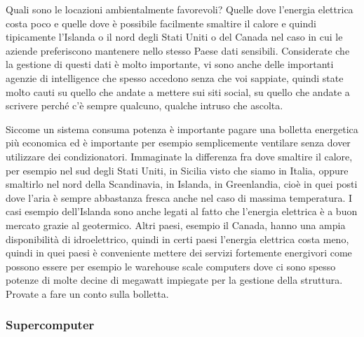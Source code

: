 Quali sono le locazioni ambientalmente favorevoli?
Quelle dove l'energia elettrica costa poco e quelle dove è possibile facilmente smaltire il calore e quindi tipicamente l'Islanda o il nord degli Stati Uniti o del Canada nel caso in cui le aziende preferiscono mantenere nello stesso Paese dati sensibili.
Considerate che la gestione di questi dati è molto importante, vi sono anche delle importanti agenzie di intelligence che spesso accedono senza che voi sappiate, quindi state molto cauti su quello che andate a mettere sui siti social, su quello che andate a scrivere perché c'è sempre qualcuno, qualche intruso che ascolta.

Siccome un sistema consuma potenza è importante pagare una bolletta energetica più economica ed è importante per esempio semplicemente ventilare senza dover utilizzare dei condizionatori.
Immaginate la differenza fra dove smaltire il calore, per esempio nel sud degli Stati Uniti, in Sicilia visto che siamo in Italia, oppure smaltirlo nel nord della Scandinavia, in Islanda, in Greenlandia, cioè in quei posti dove l'aria è sempre abbastanza fresca anche nel caso di massima temperatura.
I casi esempio dell'Islanda sono anche legati al fatto che l'energia elettrica è a buon mercato grazie al geotermico.
Altri paesi, esempio il Canada, hanno una ampia disponibilità di idroelettrico, quindi in certi paesi l'energia elettrica costa meno, quindi in quei paesi è conveniente mettere dei servizi fortemente energivori come possono essere per esempio le warehouse scale computers dove ci sono spesso potenze di molte decine di megawatt impiegate per la gestione della struttura. Provate a fare un conto sulla bolletta.

\subsubsection{Supercomputer}

